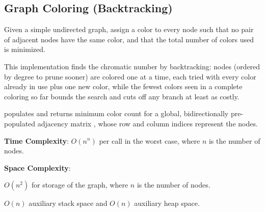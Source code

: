 \subsection{Graph Coloring (Backtracking)}
\label{sec:4.7.2}
Given a simple undirected graph, assign a color to every node such that no pair of adjacent nodes have the same color, and that the total number of colors used is minimized.

This implementation finds the chromatic number by backtracking: nodes (ordered by degree to prune sooner) are colored one at a time, each tried with every color already in use plus one new color, while the fewest colors seen in a complete coloring so far bounds the search and cuts off any branch at least as costly.

\begin{compactitem}
  \item {} populates  and returns minimum color count for a global, bidirectionally pre-populated adjacency matrix , whose row and column indices represent the nodes.
\end{compactitem}

\textbf{Time Complexity}: $O(n^{n})$ per call in the worst case, where $n$ is the number of nodes.

\textbf{Space Complexity}:
\begin{compactitem}
  \item $O(n^{2})$ for storage of the graph, where $n$ is the number of nodes.
  \item $O(n)$ auxiliary stack space and $O(n)$ auxiliary heap space.
\end{compactitem}

